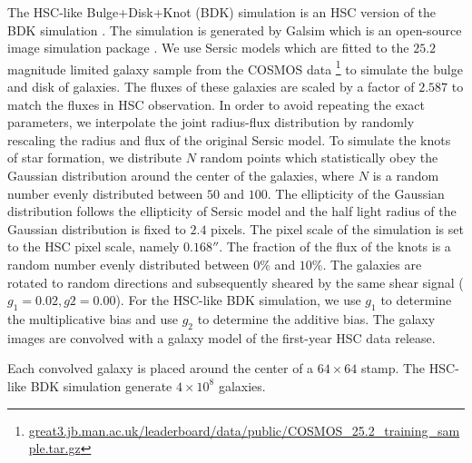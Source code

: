 The HSC-like Bulge+Disk+Knot (BDK) simulation is an HSC version of the BDK
simulation \citep{metacal-Sheldon2017}. The simulation is generated by Galsim which is an
open-source image simulation package \citep{GalSim}. We use Sersic models
\citep{Sersic1963} which are fitted to the $25.2$ magnitude limited galaxy
sample from the COSMOS data
\footnote{\url{great3.jb.man.ac.uk/leaderboard/data/public/COSMOS_25.2_training_sample.tar.gz}}
to simulate the bulge and disk of galaxies. The fluxes of these galaxies are
scaled by a factor of $2.587$ to match the fluxes in HSC observation. In order
to avoid repeating the exact parameters, we interpolate the joint radius-flux
distribution by randomly rescaling the radius and flux of the original Sersic
model. To simulate the knots of star formation, we distribute $N$ random points
which statistically obey the Gaussian distribution around the center of the
galaxies, where $N$ is a random number evenly distributed between $50$ and
$100$. The ellipticity of the Gaussian distribution follows the ellipticity of
Sersic model and the half light radius of the Gaussian distribution is fixed to
$2.4$ pixels. The pixel scale of the simulation is set to the HSC pixel scale,
namely $0.168''$. The fraction of the flux of the knots is a random number
evenly distributed between $0\%$ and $10\%$. The galaxies are rotated to random
directions and subsequently sheared by the same shear signal
($g_1=0.02,g2=0.00$). For the HSC-like BDK simulation, we use $g_1$ to
determine the multiplicative bias and use $g_2$ to determine the additive bias.
The galaxy images are convolved with a galaxy model of the first-year HSC
data release.


Each convolved galaxy is placed around the center of a $64\times 64$ stamp. The
HSC-like BDK simulation generate $4\times 10^8$ galaxies.
